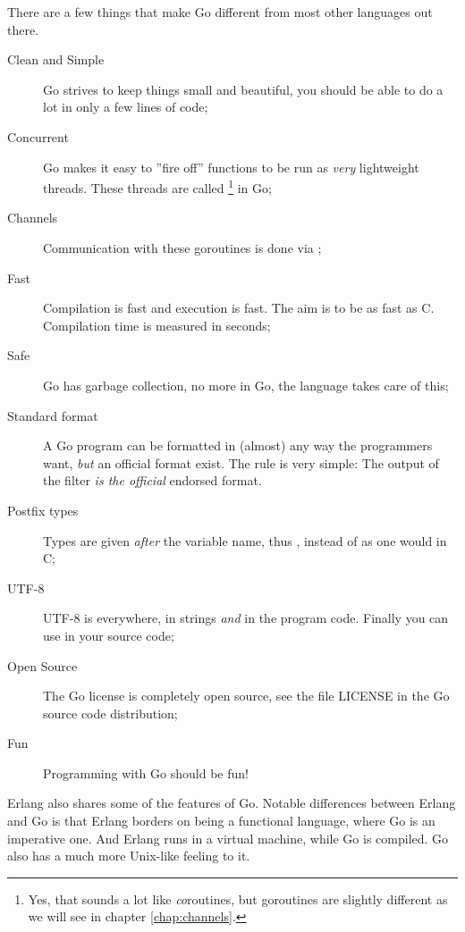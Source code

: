 \noindent{}There are a few things that make Go different from most other
languages out there.
\begin{description}
\item[Clean and Simple]
Go strives to keep things small and beautiful, you should
be able to do a lot in only a few lines of code;
\item[Concurrent]
Go makes it easy to ''fire off'' functions to be
run as \emph{very} lightweight threads. These threads are called
 \footnote{Yes, that sounds a lot like
\emph{co}routines, but goroutines are slightly different as we will
see in chapter \ref{chap:channels}.} in Go;

\item[Channels] 
Communication with these goroutines is done
via  \cite{csp}\cite{hoare};

\item[Fast]
Compilation is fast and execution is fast. The aim is
to be as fast as C. Compilation time is measured in seconds;

\item[Safe]
Go has garbage collection, no more  in Go,
the language takes care of this;

\item[Standard format]
A Go program can be formatted in (almost) any way the programmers want,
\emph{but} an official format exist. The rule is very simple:
The output of the filter  \emph{is the official} endorsed
format.

\item[Postfix types]
Types are given \emph{after} the variable name, thus ,
instead of  as one would in C;

\item[UTF-8]
UTF-8 is everywhere, in strings
\emph{and} in the program code. Finally you can use  in your source code;

\item[Open Source]
The Go license is completely open source, see the file LICENSE in the Go
source code distribution;

\item[Fun]
Programming with Go should be fun!

\end{description}
Erlang \cite{erlang} also shares some
of the features of Go. Notable differences between Erlang
and Go is that Erlang borders on being a functional language,
where Go is an imperative one. And Erlang runs in a virtual
machine, while Go is compiled. Go also has a much more Unix-like
feeling to it.


